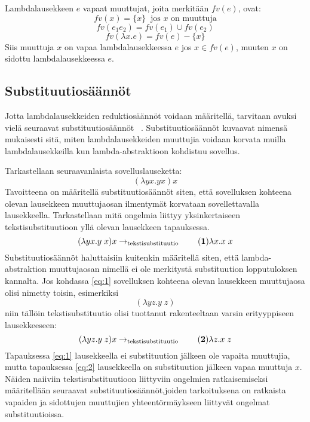 \begin{maar}
Lambdalausekkeen $e$ vapaat muuttujat, joita merkitään $fv(e)$, ovat: 
\[fv(x) = \{x\}\ \text{ jos } x \text{ on muuttuja} \]
\[fv(e_{1}e_{2}) = fv(e_{1}) \cup fv(e_{2}) \]
\[ fv(\lambda x.e) = fv(e) - \{x\} \]
Siis muuttuja $x$ on vapaa lambdalausekkeessa $e$ jos $x \in fv(e)$, muuten $x$ on sidottu lambdalausekkeessa $e$.
\end{maar} 

\subsection{Substituutiosäännöt}
Jotta lambdalausekkeiden reduktiosäännöt voidaan määritellä, tarvitaan avuksi vielä seuraavat substituutiosäännöt ~\cite[s.~8]{Hudak89}. Substituutiosäännöt kuvaavat nimensä mukaisesti sitä, miten lambdalausekkeiden muuttujia voidaan korvata muilla lambdalausekkeilla kun lambda-abstraktioon kohdistuu sovellus.
\par
Tarkastellaan seuraavanlaista sovelluslauseketta:
\[ (\lambda yx . yx) x \]
Tavoitteena on määritellä substituutiosäännöt siten, että sovelluksen kohteena olevan lausekkeen muuttujaosan ilmentymät korvataan sovellettavalla lausekkeella. Tarkastellaan mitä ongelmia liittyy yksinkertaiseen tekstisubstituutioon yllä olevan lausekkeen tapauksessa.
\[  
	(\lambda yx . y \; x) x  \rightarrow_{\text{tekstisubstituutio}} \label{eq:1} \tag{\textbf{1}}
	\lambda x . x \; x
\]
Substituutiosäännöt haluttaisiin kuitenkin määritellä siten, että lambda-abstraktion muuttujaosan nimellä ei ole merkitystä substituution lopputuloksen kannalta. Jos kohdassa \eqref{eq:1} sovelluksen kohteena olevan lausekkeen muuttujaosa olisi nimetty toisin, esimerkiksi
\[  (\lambda yz . y \; z)  \]
niin tällöin tekstisubstituutio olisi tuottanut rakenteeltaan varsin erityyppiseen lausekkeeseen:
\[  
	(\lambda yz . y \; z) x  \rightarrow_{\text{tekstisubstituutio}} \label{eq:2} \tag{\textbf{2}}
	\lambda z . x \; z
\]
Tapauksessa \eqref{eq:1} lausekkeella ei substituution jälkeen ole vapaita muuttujia, mutta tapauksessa \eqref{eq:2} lausekkeella on substituution jälkeen vapaa muuttuja $x$.
Näiden naiiviin tekstisubstituutioon liittyviin ongelmien ratkaisemiseksi määritellään seuraavat substituutiosäännöt,joiden tarkoituksena on ratkaista vapaiden ja sidottujen muuttujien yhteentörmäykseen liittyvät ongelmat substituutioissa.

